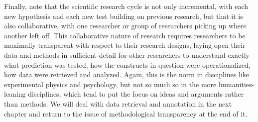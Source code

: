 Finally, note that the scientific research cycle is not only incremental, with each new hypothesis  and each new test building on previous research, but that it is also collaborative, with one researcher or group of researchers picking up where another left off. This collaborative nature of research requires researchers to be maximally transparent with respect to their research designs,  laying open their data and methods in sufficient detail for other researchers to understand exactly what prediction was tested, how the constructs in question were operationalized,  how data were retrieved  and analyzed. Again, this is the norm in disciplines like experimental  physics and psychology,  but not so much so in the more humanities\hyp{}leaning  disciplines, which tend to put the focus on ideas and arguments rather than methods. We will deal with data retrieval and annotation  in the next chapter and return to the issue of methodological transparency at the end of it.